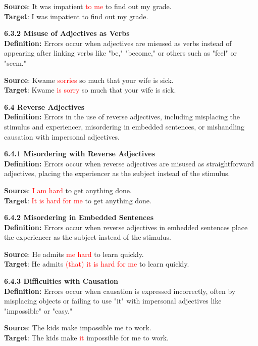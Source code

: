 \begin{tcolorbox}[breakable]
\textbf{Source}: It was impatient \textcolor{red}{to me} to find out my grade. \\
\textbf{Target}: I was impatient to find out my grade.


\noindent \textbf{6.3.2 Misuse of Adjectives as Verbs}\\
\textbf{Definition:} Errors occur when adjectives are misused as verbs instead of appearing after linking verbs like "be," "become," or others such as "feel" or "seem."


\textbf{Source}: Kwame \textcolor{red}{sorries} so much that your wife is sick. \\
\textbf{Target}: Kwame \textcolor{red}{is sorry} so much that your wife is sick.


\noindent \textbf{6.4 Reverse Adjectives}\\
\textbf{Definition:} Errors in the use of reverse adjectives, including misplacing the stimulus and experiencer, misordering in embedded sentences, or mishandling causation with impersonal adjectives.

\noindent \textbf{6.4.1 Misordering with Reverse Adjectives}\\
\textbf{Definition:} Errors occur when reverse adjectives are misused as straightforward adjectives, placing the experiencer as the subject instead of the stimulus.


\textbf{Source}: \textcolor{red}{I am hard} to get anything done. \\
\textbf{Target}: \textcolor{red}{It is hard for me} to get anything done.


\noindent \textbf{6.4.2 Misordering in Embedded Sentences}\\
\textbf{Definition:} Errors occur when reverse adjectives in embedded sentences place the experiencer as the subject instead of the stimulus.


\textbf{Source}: He admits \textcolor{red}{me hard} to learn quickly. \\
\textbf{Target}: He admits \textcolor{red}{(that) it is hard for me} to learn quickly.


\noindent \textbf{6.4.3 Difficulties with Causation}\\
\textbf{Definition:} Errors occur when causation is expressed incorrectly, often by misplacing objects or failing to use "it" with impersonal adjectives like "impossible" or "easy."


\textbf{Source}: The kids make impossible me to work. \\
\textbf{Target}: The kids make \textcolor{red}{it} impossible for me to work.

\end{tcolorbox}

